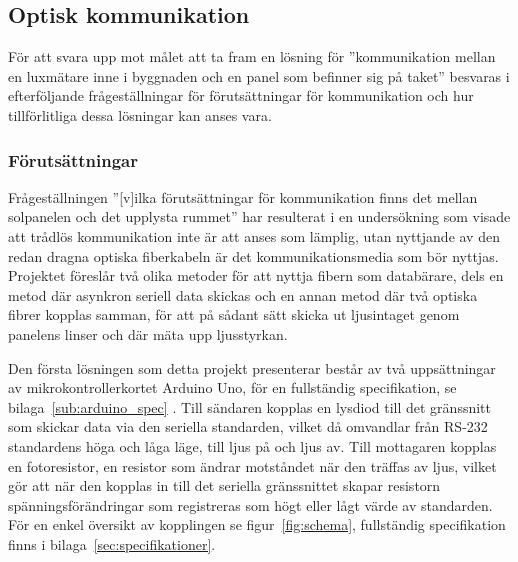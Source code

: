     \subsection{Optisk kommunikation} %
    \label{sub:optisk_kommunikation}
        För att svara upp mot målet att ta fram en lösning för ''kommunikation mellan en luxmätare inne i byggnaden och en panel som befinner sig på taket'' besvaras i efterföljande frågeställningar för förutsättningar för kommunikation och hur tillförlitliga dessa lösningar kan anses vara.

        \subsubsection{Förutsättningar} %
        \label{sub:forutsattningar}
                
            Frågeställningen ''[v]ilka förutsättningar för kommunikation finns det mellan solpanelen och det upplysta rummet'' har resulterat i en undersökning som visade att trådlös kommunikation inte är att anses som lämplig, utan nyttjande av den redan dragna optiska fiberkabeln är det kommunikationsmedia som bör nyttjas. Projektet föreslår två olika metoder för att nyttja fibern som databärare, dels en metod där asynkron seriell data skickas och en annan metod där två optiska fibrer kopplas samman, för att på sådant sätt skicka ut ljusintaget genom panelens linser och där mäta upp ljusstyrkan.\bigskip

            Den första lösningen som detta projekt presenterar består av två uppsättningar av mikrokontrollerkortet Arduino Uno, för en fullständig specifikation, se bilaga~\ref{sub:arduino_spec} \cite{ardu}. Till sändaren kopplas en lysdiod till det gränssnitt som skickar data via den seriella standarden, vilket då omvandlar från RS-232 standardens höga och låga läge, till ljus på och ljus av. Till mottagaren kopplas en fotoresistor, en resistor som ändrar motståndet när den träffas av ljus, vilket gör att när den kopplas in till det seriella gränssnittet skapar resistorn spänningsförändringar som registreras som högt eller lågt värde av standarden. För en enkel översikt av kopplingen se figur~\ref{fig:schema}, fullständig specifikation finns i bilaga~\ref{sec:specifikationer}.\bigskip

